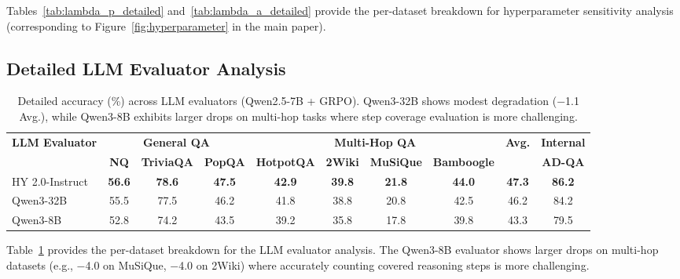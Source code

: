 \documentclass[11pt]{article}
\begin{document}
Tables~\ref{tab:lambda_p_detailed} and~\ref{tab:lambda_a_detailed} provide the per-dataset breakdown for hyperparameter sensitivity analysis (corresponding to Figure~\ref{fig:hyperparameter} in the main paper).

\subsection{Detailed LLM Evaluator Analysis}
\label{sec:appendix_evaluator}

\begin{table}[h]
\centering
\small
\begin{tabular}{l|ccc|cccc|c|c}
\toprule
\multirow{2}{*}{\textbf{LLM Evaluator}} & \multicolumn{3}{c|}{\textbf{General QA}} & \multicolumn{4}{c|}{\textbf{Multi-Hop QA}} & \multirow{2}{*}{\textbf{Avg.}} & \textbf{Internal} \\
& \textbf{NQ} & \textbf{TriviaQA} & \textbf{PopQA} & \textbf{HotpotQA} & \textbf{2Wiki} & \textbf{MuSiQue} & \textbf{Bamboogle} & & \textbf{AD-QA} \\
\midrule
HY 2.0-Instruct & \textbf{56.6} & \textbf{78.6} & \textbf{47.5} & \textbf{42.9} & \textbf{39.8} & \textbf{21.8} & \textbf{44.0} & \textbf{47.3} & \textbf{86.2} \\
Qwen3-32B & 55.5 & 77.5 & 46.2 & 41.8 & 38.8 & 20.8 & 42.5 & 46.2 & 84.2 \\
Qwen3-8B & 52.8 & 74.2 & 43.5 & 39.2 & 35.8 & 17.8 & 39.8 & 43.3 & 79.5 \\
\bottomrule
\end{tabular}
\caption{Detailed accuracy (\%) across LLM evaluators (Qwen2.5-7B + GRPO). Qwen3-32B shows modest degradation ($-$1.1 Avg.), while Qwen3-8B exhibits larger drops on multi-hop tasks where step coverage evaluation is more challenging.}
\label{tab:evaluator_detailed}
\end{table}

Table~\ref{tab:evaluator_detailed} provides the per-dataset breakdown for the LLM evaluator analysis. The Qwen3-8B evaluator shows larger drops on multi-hop datasets (e.g., $-$4.0 on MuSiQue, $-$4.0 on 2Wiki) where accurately counting covered reasoning steps is more challenging.
\end{document}

